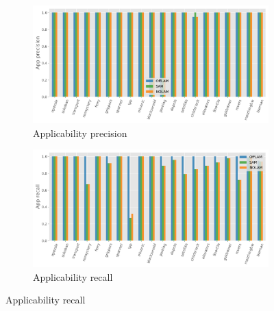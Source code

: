 \begin{figure}[htbp]
  \begin{subfigure}[b]{0.45\textwidth}
    \includegraphics[width=\textwidth]{figures/app_precision.png}
    \caption{Applicability precision}
  \end{subfigure}
  \hfill
  \begin{subfigure}[b]{0.45\textwidth}
    \includegraphics[width=\textwidth]{figures/app_recall.png}
    \caption{Applicability recall}
  \end{subfigure}

  \vspace{1em}


\end{figure}
